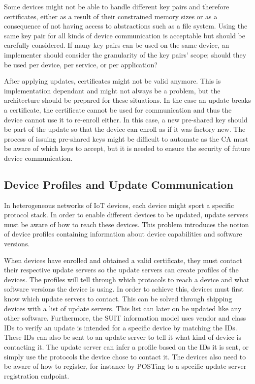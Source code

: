 \documentclass[0-thesis.tex]{subfiles}
\begin{document}
Some devices might not be able to handle different key pairs and therefore certificates,
either as a result of their constrained memory sizes or as a consequence of not having
access to abstractions such as a file system. Using the same key pair for all kinds of
device communication is acceptable but should be carefully considered. If many key pairs
can be used on the same device, an implementer should consider the granularity of the key
pairs' scope; should they be used per device, per service, or per application?

After applying updates, certificates might not be valid anymore. This is implementation
dependant and might not always be a problem, but the architecture should be prepared for
these situations. In the case an update breaks a certificate, the certificate cannot be
used for communication and thus the device cannot use it to re-enroll either. In this
case, a new pre-shared key should be part of the update so that the device can enroll as
if it was factory new. The process of issuing pre-shared keys might be difficult to
automate as the CA must be aware of which keys to accept, but it is needed to ensure the
security of future device communication.

\subsection{Device Profiles and Update Communication}
\label{ssec:communication}
In heterogeneous networks of IoT devices, each device might sport a specific protocol
stack. In order to enable different devices to be updated, update servers must be aware of
how to reach these devices. This problem introduces the notion of device profiles
containing information about device capabilities and software versions. 

When devices have enrolled and obtained a valid certificate, they must contact their
respective update servers so the update servers can create profiles of the devices. The
profiles will tell through which protocols to reach a device and what software versions
the device is using. In order to achieve this, devices must first know which update
servers to contact. This can be solved through shipping devices with a list of update
servers. This list can later on be updated like any other software. Furthermore, the SUIT
information model uses vendor and class IDs to verify an update is intended for a specific
device by matching the IDs. These IDs can also be sent to an update server to tell it what
kind of device is contacting it. The update server can infer a profile based on the IDs it
is sent, or simply use the protocols the device chose to contact it. The devices also need
to be aware of how to register, for instance by POSTing to a specific update server
registration endpoint. 
\end{document}
